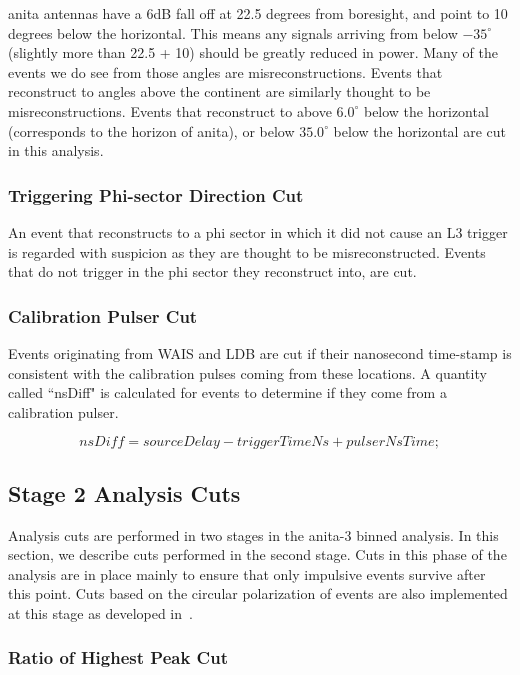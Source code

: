 \gls{anita} antennas have a 6dB fall off at 22.5 degrees from boresight, and point to 10 degrees below the horizontal.  This means any signals arriving from below $-35^{\circ}$ (slightly more than 22.5 + 10) should be greatly reduced in power.  Many of the events we do see from those angles are misreconstructions. Events that reconstruct to angles above the continent are similarly thought to be misreconstructions.  Events that reconstruct to above $6.0^{\circ}$ below the horizontal (corresponds to the horizon of \gls{anita}), or below $35.0^{\circ}$ below the horizontal are cut in this analysis. 

\subsubsection{Triggering Phi-sector Direction Cut}

An event that reconstructs to a phi sector in which it did not cause an L3 trigger is regarded with suspicion as they are thought to be misreconstructed. 
Events that do not trigger in the phi sector they reconstruct into, are cut. 

\subsubsection{Calibration Pulser Cut}

Events originating from WAIS and LDB are cut if their nanosecond time-stamp is consistent with the calibration pulses coming from these locations. A quantity called ``nsDiff" is calculated for events to determine if they come from a calibration pulser. 

\begin{equation}
nsDiff = sourceDelay - triggerTimeNs + pulserNsTime;
\end{equation}


\subsection{Stage 2 Analysis Cuts}

Analysis cuts are performed in two stages in the \gls{anita}-3 binned analysis. In this section, we describe cuts performed in the second stage. Cuts in this phase of the analysis are in place mainly to ensure that only impulsive events survive after this point. Cuts based on the circular polarization of events are also implemented at this stage as developed in~\cite{samStaffordThesis}. 

\subsubsection{Ratio of Highest Peak Cut}


